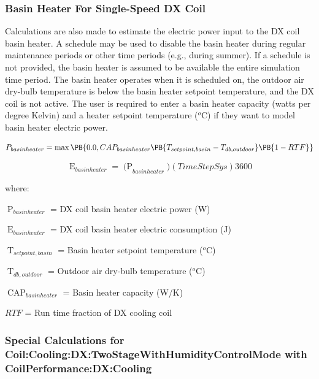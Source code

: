 \subsubsection{Basin Heater For Single-Speed DX Coil}\label{basin-heater-for-single-speed-dx-coil}

Calculations are also made to estimate the electric power input to the DX coil basin heater. A schedule may be used to disable the basin heater during regular maintenance periods or other time periods (e.g., during summer). If a schedule is not provided, the basin heater is assumed to be available the entire simulation time period. The basin heater operates when it is scheduled on, the outdoor air dry-bulb temperature is below the basin heater setpoint temperature, and the DX coil is not active. The user is required to enter a basin heater capacity (watts per degree Kelvin) and a heater setpoint temperature (\(^{o}\)C) if they want to model basin heater electric power.

\begin{equation}
 P_{basinheater} = \max\PB{0.0, CAP_{basinheater} \PB{T_{setpoint,basin} - T_{db,outdoor} }\PB{1 - RTF}}
\end{equation}

\begin{equation}
  \mathop E\nolimits_{basinheater} = \mathop {(P}\nolimits_{basinheater} )(TimeStepSys)3600
\end{equation}

where:

\(\mathop P\nolimits_{basinheater}\) = DX coil basin heater electric power (W)

\(\mathop E\nolimits_{basinheater}\) = DX coil basin heater electric consumption (J)

\(\mathop T\nolimits_{setpoint,basin}\) = Basin heater setpoint temperature (\(^{o}\)C)

\(\mathop T\nolimits_{db,outdoor}\) = Outdoor air dry-bulb temperature (\(^{o}\)C)

\(\mathop {CAP}\nolimits_{basinheater}\) = Basin heater capacity (W/K)

\(RTF\) = Run time fraction of DX cooling coil

\subsubsection{Special Calculations for Coil:Cooling:DX:TwoStageWithHumidityControlMode with CoilPerformance:DX:Cooling}\label{special-calculations-for-coilcoolingdxtwostagewithhumiditycontrolmode-with-coilperformancedxcooling}


